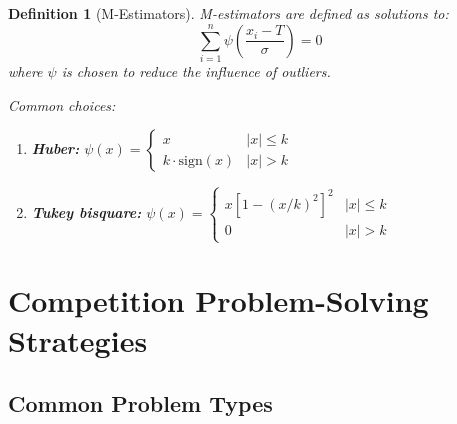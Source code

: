 \documentclass[12pt,a4paper]{article}
\newtheorem{definition}{Definition}[section]
\theoremstyle{remark}
\begin{document}
\begin{definition}[M-Estimators]
M-estimators are defined as solutions to:
$$\sum_{i=1}^n \psi\left(\frac{x_i - T}{\sigma}\right) = 0$$
where $\psi$ is chosen to reduce the influence of outliers.

Common choices:
\begin{enumerate}
\item \textbf{Huber:} $\psi(x) = \begin{cases} x & |x| \leq k \\ k \cdot \text{sign}(x) & |x| > k \end{cases}$
\item \textbf{Tukey bisquare:} $\psi(x) = \begin{cases} x[1-(x/k)^2]^2 & |x| \leq k \\ 0 & |x| > k \end{cases}$
\end{enumerate}
\end{definition}

\section{Competition Problem-Solving Strategies}

\subsection{Common Problem Types}
\end{document}
